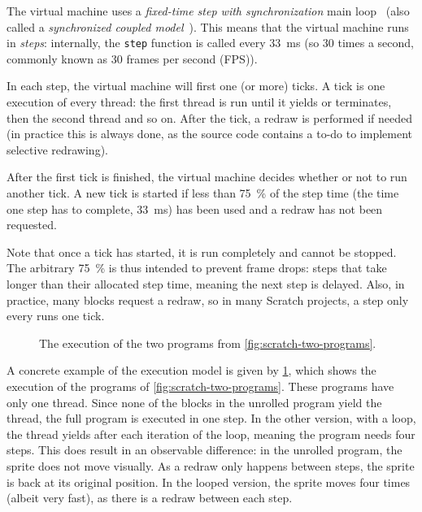 \documentclass[../main]{subfiles}
\begin{document}
The virtual machine uses a \emph{fixed-time step with synchronization} main loop~\autocite{nystromGameProgrammingPatterns2014} (also called a \emph{synchronized coupled model}~\autocite{valenteRealTimeGame2005}).
This means that the virtual machine runs in \emph{steps}: internally, the \texttt{step} function is called every \qty{33}{\milli\second} (so 30 times a second, commonly known as 30 frames per second (FPS)).

In each step, the virtual machine will first one (or more) ticks.
A tick is one execution of every thread: the first thread is run until it yields or terminates, then the second thread and so on.
After the tick, a redraw is performed if needed (in practice this is always done, as the source code contains a to-do to implement selective redrawing).

After the first tick is finished, the virtual machine decides whether or not to run another tick.
A new tick is started if less than \qty{75}{\percent} of the step time (the time one step has to complete, \qty{33}{\milli\second}) has been used and a redraw has not been requested.

Note that once a tick has started, it is run completely and cannot be stopped.
The arbitrary \qty{75}{\percent} is thus intended to prevent frame drops: steps that take longer than their allocated step time, meaning the next step is delayed.
Also, in practice, many blocks request a redraw, so in many Scratch projects, a step only every runs one tick.

\begin{figure}
    \centering
    \begin{subfigure}{0.40\textwidth}
        
    \end{subfigure}
    \begin{subfigure}{0.59\textwidth}
        
    \end{subfigure}
    \caption{The execution of the two programs from \cref{fig:scratch-two-programs}.}\label{fig:scratch-two-execution}
\end{figure}

A concrete example of the execution model is given by \cref{fig:scratch-two-execution}, which shows the execution of the programs of \cref{fig:scratch-two-programs}.
These programs have only one thread.
Since none of the blocks in the unrolled program yield the thread, the full program is executed in one step.
In the other version, with a loop, the thread yields after each iteration of the loop, meaning the program needs four steps.
This does result in an observable difference: in the unrolled program, the sprite does not move visually.
As a redraw only happens between steps, the sprite is back at its original position.
In the looped version, the sprite moves four times (albeit very fast), as there is a redraw between each step.
\end{document}
